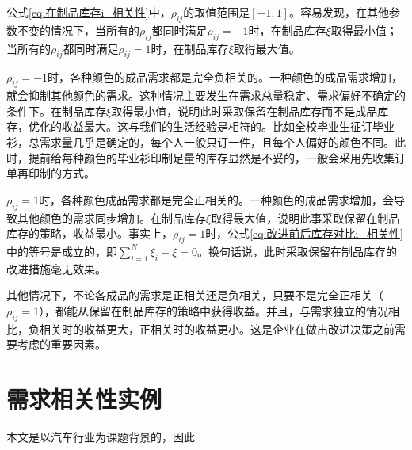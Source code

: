 公式\ref{eq:在制品库存i_相关性}中，$\rho_{ij}$的取值范围是$[-1,1]$。容易发现，在其他参数不变的情况下，当所有的$\rho_{ij}$都同时满足$\rho_{ij}=-1$时，在制品库存$\xi$取得最小值；当所有的$\rho_{ij}$都同时满足$\rho_{ij}=1$时，在制品库存$\xi$取得最大值。

$\rho_{ij}=-1$时，各种颜色的成品需求都是完全负相关的。一种颜色的成品需求增加，就会抑制其他颜色的需求。这种情况主要发生在需求总量稳定、需求偏好不确定的条件下。在制品库存$\xi$取得最小值，说明此时采取保留在制品库存而不是成品库存，优化的收益最大。这与我们的生活经验是相符的。比如全校毕业生征订毕业衫，总需求量几乎是确定的，每个人一般只订一件，且每个人偏好的颜色不同。此时，提前给每种颜色的毕业衫印制足量的库存显然是不妥的，一般会采用先收集订单再印制的方式。

$\rho_{ij}=1$时，各种颜色成品需求都是完全正相关的。一种颜色的成品需求增加，会导致其他颜色的需求同步增加。在制品库存$\xi$取得最大值，说明此事采取保留在制品库存的策略，收益最小。事实上，$\rho_{ij}=1$时，公式\ref{eq:改进前后库存对比i_相关性}中的等号是成立的，即$\sum_{i=1}^N\xi_i - \xi = 0$。换句话说，此时采取保留在制品库存的改进措施毫无效果。

其他情况下，不论各成品的需求是正相关还是负相关，只要不是完全正相关（$\rho_{ij}=1$），都能从保留在制品库存的策略中获得收益。并且，与需求独立的情况相比，负相关时的收益更大，正相关时的收益更小。这是企业在做出改进决策之前需要考虑的重要因素。









\section{需求相关性实例}

本文是以汽车行业为课题背景的，因此
















